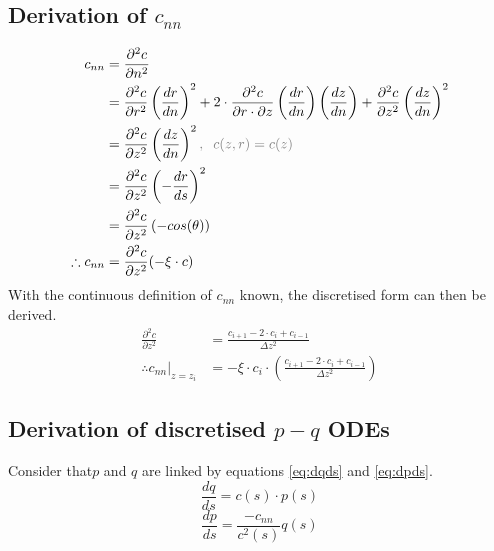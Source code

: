 \documentclass{article}
\begin{document}
\subsection{Derivation of $c_{nn}$}
\begin{align*}
  c_{nn} &= \frac{\partial^2 c}{\partial n^2}\\
         &=\frac{\partial ^2 c}{\partial r^2}\left(\frac{dr}{dn}\right)^2 + 2\cdot\frac{\partial^2 c}{\partial r\cdot \partial z}\left(\frac{dr}{dn}\right)\left(\frac{dz}{dn}\right) + \frac{\partial ^2 c}{\partial z^2 }\left(\frac{dz}{dn}\right)^2\\
         &=\frac{\partial^2 c}{\partial z^2}\left(\frac{dz}{dn}\right)^2\textcolor{gray}{,\;\;c(z, r)=c(z)}\\
         &=\frac{\partial ^2c}{\partial z^2}\left(-\frac{dr}{ds}\right)^2\\
         &=\frac{\partial^2c}{\partial z^2}\left(-cos(\theta)\right)\\
  \therefore c_{nn} &= \frac{\partial^2 c}{\partial z^2}(-\xi\cdot c)
\end{align*}
With the continuous definition of $c_{nn}$ known, the discretised form can then be derived.
\begin{align*}
  \frac{\partial^2 c}{\partial z^2} &= \frac{c_{i+1}-2\cdot c_i + c_{i-1}}{\Delta z^2}\\
  \therefore \left.c_{nn}\right|_{z=z_i} &= -\xi\cdot c_i\cdot\left(\frac{c_{i+1}-2\cdot c_i + c_{i-1}}{\Delta z^2}\right)
\end{align*}

\subsection{Derivation of discretised $p-q$ ODEs}
Consider that$p$ and $q$ are linked by equations \ref{eq:dqds} and \ref{eq:dpds}.
\begin{equation}
  \label{eq:dqds}
  \frac{dq}{ds}=c(s)\cdot p(s)
\end{equation}
\begin{equation}
  \label{eq:dpds}
  \frac{dp}{ds}=\frac{-c_{nn}}{c^2(s)}q(s)
\end{equation}
\end{document}
